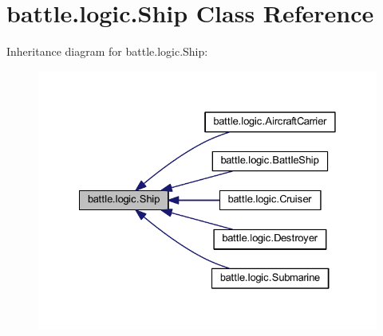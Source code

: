 \hypertarget{classbattle_1_1logic_1_1_ship}{}\section{battle.\+logic.\+Ship Class Reference}
\label{classbattle_1_1logic_1_1_ship}


Inheritance diagram for battle.\+logic.\+Ship\+:
\nopagebreak
\begin{figure}[H]
\begin{center}
\leavevmode
\includegraphics[width=328pt]{classbattle_1_1logic_1_1_ship__inherit__graph}
\end{center}
\end{figure}
